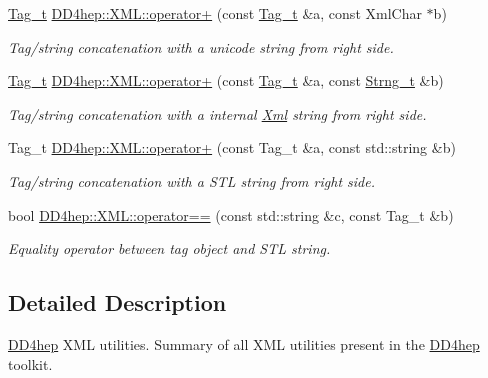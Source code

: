 \begin{DoxyCompactItemize}
\hyperlink{class_d_d4hep_1_1_x_m_l_1_1_tag__t}{Tag\_\-t} \hyperlink{group___d_d4_h_e_p___x_m_l_ga658bb45f4c5cc614a2508957b27c0bd7}{DD4hep::XML::operator+} (const \hyperlink{class_d_d4hep_1_1_x_m_l_1_1_tag__t}{Tag\_\-t} \&a, const XmlChar $\ast$b)
\begin{DoxyCompactList}\small\item\em Tag/string concatenation with a unicode string from right side. \item\end{DoxyCompactList}\item 
\hyperlink{class_d_d4hep_1_1_x_m_l_1_1_tag__t}{Tag\_\-t} \hyperlink{group___d_d4_h_e_p___x_m_l_ga64cd4f3e74d5147d8a0dda8d7dc5b372}{DD4hep::XML::operator+} (const \hyperlink{class_d_d4hep_1_1_x_m_l_1_1_tag__t}{Tag\_\-t} \&a, const \hyperlink{class_d_d4hep_1_1_x_m_l_1_1_strng__t}{Strng\_\-t} \&b)
\begin{DoxyCompactList}\small\item\em Tag/string concatenation with a internal \hyperlink{union_xml}{Xml} string from right side. \item\end{DoxyCompactList}\item 
Tag\_\-t \hyperlink{group___d_d4_h_e_p___x_m_l_ga4296bedbf278d7bbd894b9e07bedf79a}{DD4hep::XML::operator+} (const Tag\_\-t \&a, const std::string \&b)
\begin{DoxyCompactList}\small\item\em Tag/string concatenation with a STL string from right side. \item\end{DoxyCompactList}\item 
bool \hyperlink{group___d_d4_h_e_p___x_m_l_ga147592045f1692bc1bce671299c71a77}{DD4hep::XML::operator==} (const std::string \&c, const Tag\_\-t \&b)
\begin{DoxyCompactList}\small\item\em Equality operator between tag object and STL string. \item\end{DoxyCompactList}\end{DoxyCompactItemize}


\subsection{Detailed Description}
\hyperlink{namespace_d_d4hep}{DD4hep} XML utilities. Summary of all XML utilities present in the \hyperlink{namespace_d_d4hep}{DD4hep} toolkit. 

